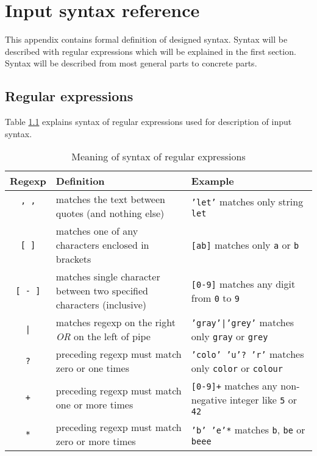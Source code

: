 
\chapter{Input syntax reference}
\label{chap:syntax}

This appendix contains formal definition of designed syntax.
Syntax will be described with regular expressions which will be explained in the first section.
Syntax will be described from most general parts to concrete parts.

\section{Regular expressions}
\label{sec:regexps}

Table \ref{tbl:regexpExplanation} explains syntax of regular expressions used for description of input syntax.

\begin{table}[ht]
	\centering
	\begin{tabular}{c p{160pt} p{170pt}}
   		\toprule
   		Regexp & Definition & Example \\
   		\midrule
		\texttt{' '} & matches the text between quotes (and nothing else) & \texttt{'let'} matches only string \texttt{let} \\ \hline
		\texttt{[ ]} & matches one of any characters enclosed in brackets & \texttt{[ab]} matches only \texttt{a} or \texttt{b} \\ \hline
		\texttt{[ - ]} & matches single character between two specified characters (inclusive) & \texttt{[0-9]} matches any digit from \texttt{0} to \texttt{9} \\ \hline
		\texttt{|} & matches regexp on the right \emph{OR} on the left of pipe & \texttt{'gray'|'grey'} matches only \texttt{gray} or \texttt{grey} \\ \hline
		\texttt{?} & preceding regexp must match zero or one times & \texttt{'colo' 'u'? 'r'} matches only \texttt{color} or \texttt{colour} \\ \hline
		\texttt{+} & preceding regexp must match one or more times & \texttt{[0-9]+} matches any non-negative integer like \texttt{5} or \texttt{42} \\ \hline
		\texttt{*} & preceding regexp must match zero or more times & \texttt{'b' 'e'*} matches \texttt{b}, \texttt{be} or \texttt{beee} \\
		\bottomrule
	\end{tabular}
	\caption{Meaning of syntax of regular expressions}
	\label{tbl:regexpExplanation}
\end{table}


